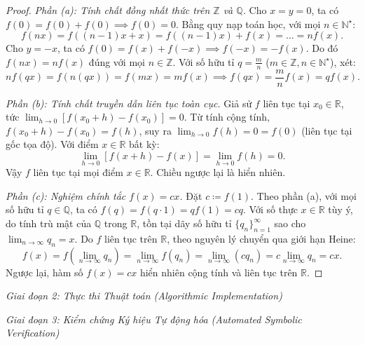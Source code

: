 \documentclass{article}
\begin{document}
\begin{proof}
\emph{Phần (a): Tính chất đồng nhất thức trên $\mathbb{Z}$ và $\mathbb{Q}$.}
Cho $x = y = 0$, ta có $f(0) = f(0) + f(0) \implies f(0) = 0$.
Bằng quy nạp toán học, với mọi $n \in \mathbb{N}^\star$:
\begin{equation}
    f(nx) = f((n-1)x + x) = f((n-1)x) + f(x) = \dots = n f(x).
\end{equation}
Cho $y = -x$, ta có $f(0) = f(x) + f(-x) \implies f(-x) = -f(x)$. Do đó $f(nx) = nf(x)$ đúng với mọi $n \in \mathbb{Z}$.
Với số hữu tỉ $q = \frac{m}{n}$ ($m \in \mathbb{Z}, n \in \mathbb{N}^\star$), xét:
\begin{equation}
    n f(qx) = f(n(qx)) = f(mx) = m f(x) \implies f(qx) = \frac{m}{n} f(x) = q f(x).
\end{equation}

\emph{Phần (b): Tính chất truyền dẫn liên tục toàn cục.}
Giả sử $f$ liên tục tại $x_0 \in \mathbb{R}$, tức $\lim_{h \to 0} [f(x_0 + h) - f(x_0)] = 0$.
Từ tính cộng tính, $f(x_0 + h) - f(x_0) = f(h)$, suy ra $\lim_{h \to 0} f(h) = 0 = f(0)$ (liên tục tại gốc tọa độ).
Với điểm $x \in \mathbb{R}$ bất kỳ:
\begin{equation}
    \lim_{h \to 0} [f(x + h) - f(x)] = \lim_{h \to 0} f(h) = 0.
\end{equation}
Vậy $f$ liên tục tại mọi điểm $x \in \mathbb{R}$. Chiều ngược lại là hiển nhiên.

\emph{Phần (c): Nghiệm chính tắc $f(x) = cx$.}
Đặt $c \coloneqq f(1)$. Theo phần (a), với mọi số hữu tỉ $q \in \mathbb{Q}$, ta có $f(q) = f(q \cdot 1) = q f(1) = cq$.
Với số thực $x \in \mathbb{R}$ tùy ý, do tính trù mật của $\mathbb{Q}$ trong $\mathbb{R}$, tồn tại dãy số hữu tỉ $\{q_n\}_{n=1}^\infty$ sao cho $\lim_{n \to \infty} q_n = x$.
Do $f$ liên tục trên $\mathbb{R}$, theo nguyên lý chuyển qua giới hạn Heine:
\begin{equation}
    f(x) = f\left(\lim_{n\to\infty} q_n\right) = \lim_{n\to\infty} f(q_n) = \lim_{n\to\infty} (c q_n) = c \lim_{n\to\infty} q_n = cx.
\end{equation}
Ngược lại, hàm số $f(x) = cx$ hiển nhiên cộng tính và liên tục trên $\mathbb{R}$.
\end{proof}

\vspace{0.5em}\noindent\emph{Giai đoạn 2: Thực thi Thuật toán (Algorithmic Implementation)}


\vspace{0.5em}\noindent\emph{Giai đoạn 3: Kiểm chứng Ký hiệu Tự động hóa (Automated Symbolic Verification)}

\end{document}
